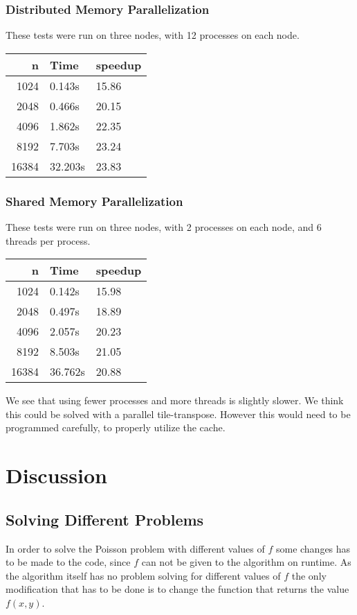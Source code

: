 \documentclass[a4paper, 12pt]{article}
\begin{document}
        \subsubsection{Distributed Memory Parallelization}
        These tests were run on three nodes, with 12 processes on each node.

        \begin{tabular}{|r|l|l|}
        \hline
        n & Time & speedup \\
        \hline
        1024 & 0.143s & 15.86 \\
        \hline
        2048 & 0.466s & 20.15 \\
        \hline
        4096 & 1.862s & 22.35 \\
        \hline
        8192 & 7.703s & 23.24\\
        \hline
        16384 & 32.203s & 23.83 \\
        \hline
        \end{tabular}
         
        \subsubsection{Shared Memory Parallelization}
        These tests were run on three nodes, with 2 processes on each node, and 6 threads per process.

        \begin{tabular}{|r|l|l|}
        \hline
        n & Time & speedup \\
        \hline
        1024 & 0.142s & 15.98 \\
        \hline
        2048 & 0.497s & 18.89 \\
        \hline
        4096 & 2.057s & 20.23 \\
        \hline
        8192 & 8.503s & 21.05\\
        \hline
        16384 & 36.762s & 20.88 \\
        \hline
        \end{tabular}
        
        We see that using fewer processes and more threads is slightly slower. We think this could be solved with a parallel tile-transpose. However this would need to be programmed carefully, to properly utilize the cache.

\section{Discussion}
	\subsection{Solving Different Problems}
	In order to solve the Poisson problem with different values of $f$ some changes has to be made to the code, since $f$ can not be given to the algorithm on runtime. As the algorithm itself has no problem solving for different values of $f$ the only modification that has to be done is to change the function that returns the value $f(x, y)$.
    
\end{document}
